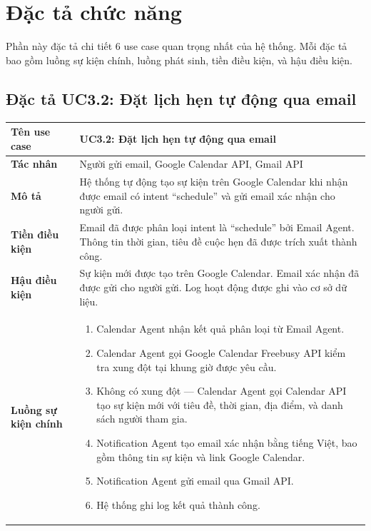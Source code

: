 \documentclass[../DoAn.tex]{subfiles}
\begin{document}
\section{Đặc tả chức năng}
\label{section:2.3}

Phần này đặc tả chi tiết 6 use case quan trọng nhất của hệ thống. Mỗi đặc tả bao gồm luồng sự kiện chính, luồng phát sinh, tiền điều kiện, và hậu điều kiện.

\subsection{Đặc tả UC3.2: Đặt lịch hẹn tự động qua email}

\begin{table}[H]
\centering
\small
\begin{tabular}{|p{3.5cm}|p{10cm}|}
\hline
\textbf{Tên use case} & UC3.2: Đặt lịch hẹn tự động qua email \\
\hline
\textbf{Tác nhân} & Người gửi email, Google Calendar API, Gmail API \\
\hline
\textbf{Mô tả} & Hệ thống tự động tạo sự kiện trên Google Calendar khi nhận được email có intent ``schedule'' và gửi email xác nhận cho người gửi. \\
\hline
\textbf{Tiền điều kiện} & Email đã được phân loại intent là ``schedule'' bởi Email Agent. Thông tin thời gian, tiêu đề cuộc hẹn đã được trích xuất thành công. \\
\hline
\textbf{Hậu điều kiện} & Sự kiện mới được tạo trên Google Calendar. Email xác nhận đã được gửi cho người gửi. Log hoạt động được ghi vào cơ sở dữ liệu. \\
\hline
\textbf{Luồng sự kiện chính} &
\begin{enumerate}
    \item Calendar Agent nhận kết quả phân loại từ Email Agent.
    \item Calendar Agent gọi Google Calendar Freebusy API kiểm tra xung đột tại khung giờ được yêu cầu.
    \item Không có xung đột — Calendar Agent gọi Calendar API tạo sự kiện mới với tiêu đề, thời gian, địa điểm, và danh sách người tham gia.
    \item Notification Agent tạo email xác nhận bằng tiếng Việt, bao gồm thông tin sự kiện và link Google Calendar.
    \item Notification Agent gửi email qua Gmail API.
    \item Hệ thống ghi log kết quả thành công.
\end{enumerate} \\

\end{tabular}
\end{table}
\end{document}
